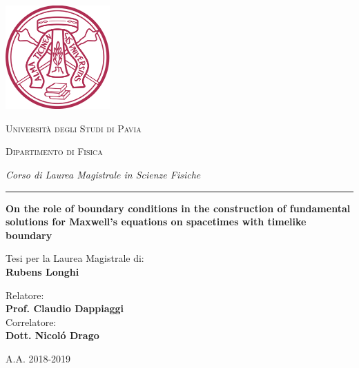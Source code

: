 \documentclass[
11pt, %
english, %
singlespacing, %
headsepline, %
]{MastersDoctoralThesis} %
\author{Rubens Longhi} %
\theoremstyle{TheoremStyle}
\theoremstyle{ExampleAndRemarkStyle}
\theoremstyle{ProofStyle}
\begin{document}
\frontmatter %

\pagestyle{plain} %


\begin{titlepage}
	\centering
	\includegraphics[width=0.3\textwidth]{unipv}\par\vspace{0.5cm}
	{\scshape\huge Universit\`a degli Studi di Pavia\par}
	\vspace{0.5cm}
	{\scshape\LARGE Dipartimento di Fisica\par
		\vspace{0.2cm}
		\Large\textit{Corso di Laurea Magistrale in Scienze Fisiche}\par}
	\vspace{1cm}
	\rule{14cm}{0.1pt}
	
	\vspace{1cm}
	{\LARGE\bfseries On the role of boundary conditions in the construction of fundamental solutions for Maxwell's equations on spacetimes with timelike boundary \par}
	\vspace{1.5cm}
	\vfill\large\begin{flushright} Tesi per la Laurea Magistrale di:\\ \textbf{Rubens Longhi} %
	\end{flushright}
	\vspace{.5cm}
	\begin{flushleft}
		Relatore:\\
		\textbf{Prof. Claudio Dappiaggi}\\[.3cm] %
		Correlatore:\\
		\textbf{Dott. Nicol\'o Drago}\\[.3cm] %
	\end{flushleft}
	
	
	
	\vfill
	
	{\large A.A. 2018-2019\par}
\end{titlepage}
\end{document}
